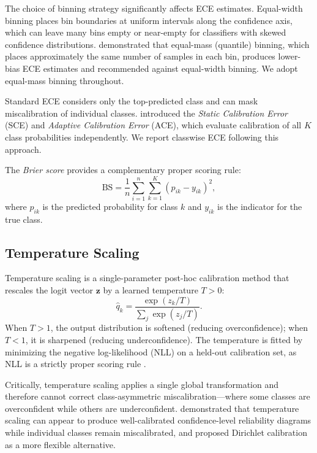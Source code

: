 \documentclass[twocolumn]{aastex631}
\begin{document}
The choice of binning strategy significantly affects ECE estimates. Equal-width binning places bin boundaries at uniform intervals along the confidence axis, which can leave many bins empty or near-empty for classifiers with skewed confidence distributions. \citet{roelofs2022} demonstrated that equal-mass (quantile) binning, which places approximately the same number of samples in each bin, produces lower-bias ECE estimates and recommended against equal-width binning. We adopt equal-mass binning throughout.

Standard ECE considers only the top-predicted class and can mask miscalibration of individual classes. \citet{nixon2019} introduced the \emph{Static Calibration Error} (SCE) and \emph{Adaptive Calibration Error} (ACE), which evaluate calibration of all $K$ class probabilities independently. We report classwise ECE following this approach.

The \emph{Brier score} \citep{brier1950} provides a complementary proper scoring rule:
\begin{equation}
\text{BS} = \frac{1}{n} \sum_{i=1}^{n} \sum_{k=1}^{K} (p_{ik} - y_{ik})^2,
\end{equation}
where $p_{ik}$ is the predicted probability for class $k$ and $y_{ik}$ is the indicator for the true class.

\subsection{Temperature Scaling}

Temperature scaling \citep{guo2017} is a single-parameter post-hoc calibration method that rescales the logit vector $\mathbf{z}$ by a learned temperature $T > 0$:
\begin{equation}
\hat{q}_k = \frac{\exp(z_k / T)}{\sum_{j} \exp(z_j / T)}.
\end{equation}
When $T > 1$, the output distribution is softened (reducing overconfidence); when $T < 1$, it is sharpened (reducing underconfidence). The temperature is fitted by minimizing the negative log-likelihood (NLL) on a held-out calibration set, as NLL is a strictly proper scoring rule \citep{gneiting2007}.

Critically, temperature scaling applies a single global transformation and therefore cannot correct class-asymmetric miscalibration---where some classes are overconfident while others are underconfident. \citet{kull2019} demonstrated that temperature scaling can appear to produce well-calibrated confidence-level reliability diagrams while individual classes remain miscalibrated, and proposed Dirichlet calibration as a more flexible alternative.
\end{document}

